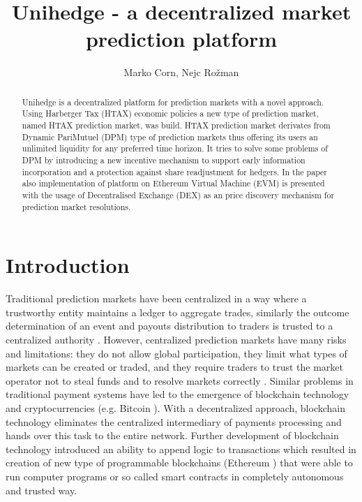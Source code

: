 \documentclass{article}
\title{Unihedge - a decentralized market prediction platform}
\author{ 
	{\hspace{1mm}Marko Corn,}
	{\hspace{1mm}Nejc Rožman}
}
\begin{document}
	
	\maketitle
	
	\begin{abstract}
		Unihedge is a decentralized platform for prediction markets with a novel approach. Using Harberger Tax (HTAX) economic policies a new type of prediction market, named HTAX prediction market, was build. HTAX prediction market derivates from Dynamic PariMutuel (DPM) type of prediction markets thus offering its users an unlimited liquidity for any preferred time horizon. It tries to solve some problems of DPM by introducing a new incentive mechanism to support early information incorporation and a protection against share readjustment for hedgers. In the paper also implementation of platform on Ethereum Virtual Machine (EVM) is presented with the usage of Decentralised Exchange (DEX) as an price discovery mechanism for prediction market resolutions.
		
	\end{abstract}
	
	
	\section{Introduction}
	
	Traditional prediction markets have been centralized in a way where a trustworthy entity maintains a ledger to aggregate trades, similarly the outcome determination of an event and payouts distribution to traders is trusted to a centralized authority \cite{Wang}. However, centralized prediction markets have many risks and limitations: they do not allow global participation, they limit what types of markets can be created or traded, and they require traders to trust the market operator not to steal funds and to resolve markets correctly \cite{Augur}. Similar problems in traditional payment systems have led to the emergence of blockchain technology and cryptocurrencies (e.g. Bitcoin \cite{Bitcoin}). With a decentralized approach, blockchain technology eliminates the centralized intermediary of payments processing and hands over this task to the entire network. Further development of blockchain technology introduced an ability to append logic to transactions which resulted in creation of new type of programmable blockchains (Ethereum \cite{Ethereum}) that were able to run computer programs or so called smart contracts in completely autonomous and trusted way.  
	
\end{document}
